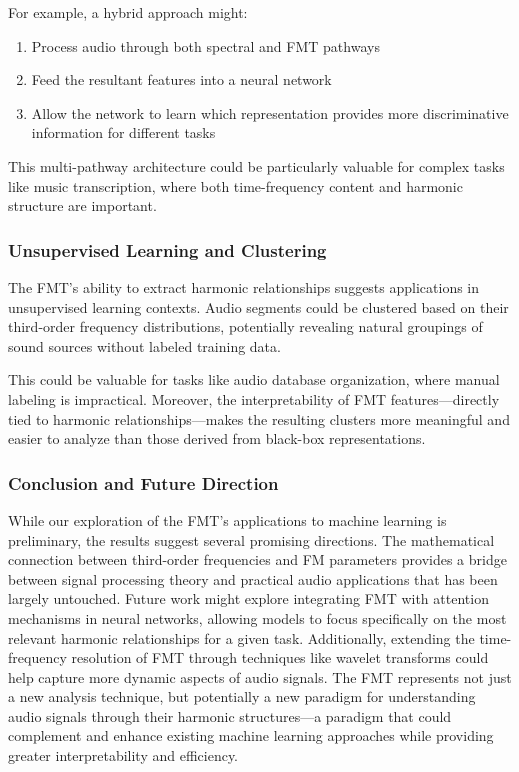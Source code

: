 \documentclass[11pt,twoside]{report}
\numberwithin{thm}{section}
\numberwithin{equation}{section}
\begin{document}
For example, a hybrid approach might:
\begin{enumerate}
    \item Process audio through both spectral and FMT pathways
    \item Feed the resultant features into a neural network
    \item Allow the network to learn which representation provides more discriminative information for different tasks
\end{enumerate}
This multi-pathway architecture could be particularly valuable for complex tasks like music transcription, where both time-frequency content and harmonic structure are important.
\subsubsection{Unsupervised Learning and Clustering}
The FMT's ability to extract harmonic relationships suggests applications in unsupervised learning contexts. Audio segments could be clustered based on their third-order frequency distributions, potentially revealing natural groupings of sound sources without labeled training data.

This could be valuable for tasks like audio database organization, where manual labeling is impractical. Moreover, the interpretability of FMT features—directly tied to harmonic relationships—makes the resulting clusters more meaningful and easier to analyze than those derived from black-box representations.
\clearpage
\subsubsection{Conclusion and Future Direction}
While our exploration of the FMT's applications to machine learning is preliminary, the results suggest several promising directions. The mathematical connection between third-order frequencies and FM parameters provides a bridge between signal processing theory and practical audio applications that has been largely untouched.
Future work might explore integrating FMT with attention mechanisms in neural networks, allowing models to focus specifically on the most relevant harmonic relationships for a given task. Additionally, extending the time-frequency resolution of FMT through techniques like wavelet transforms could help capture more dynamic aspects of audio signals.
The FMT represents not just a new analysis technique, but potentially a new paradigm for understanding audio signals through their harmonic structures—a paradigm that could complement and enhance existing machine learning approaches while providing greater interpretability and efficiency.
\end{document}
